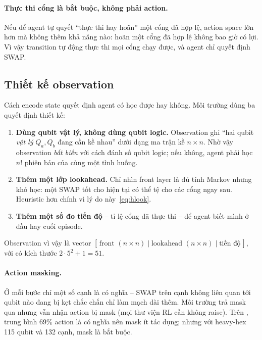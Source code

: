 \paragraph{Thực thi cổng là bắt buộc, không phải action.} Nếu để agent tự quyết ``thực thi hay hoãn''
một cổng đã hợp lệ, action space lớn hơn mà không thêm khả năng nào: hoãn một cổng đã hợp lệ không bao
giờ có lợi. Vì vậy transition tự động thực thi mọi cổng chạy được, và agent chỉ quyết định SWAP.

\subsection{Thiết kế observation}

Cách encode state quyết định agent có học được hay không. Môi trường  dùng ba quyết
định thiết kế:
\begin{enumerate}[label=(\alph*), noitemsep]
  \item \textbf{Dùng qubit vật lý, không dùng qubit logic.} Observation ghi ``hai qubit \emph{vật lý}
    $Q_a, Q_b$ đang cần kề nhau'' dưới dạng ma trận kề $n\times n$. Nhờ vậy observation \emph{bất biến}
    với cách đánh số qubit logic; nếu không, agent phải học $n!$ phiên bản của cùng một tình huống.
  \item \textbf{Thêm một lớp lookahead.} Chỉ nhìn front layer là đủ tính Markov nhưng khó học: một SWAP
    tốt cho hiện tại có thể tệ cho các cổng ngay sau. Heuristic  hơn 
    chính vì lý do này~\eqref{eq:hlook}.
  \item \textbf{Thêm một số đo tiến độ} -- tỉ lệ cổng đã thực thi -- để agent biết mình ở đầu hay cuối
    episode.
\end{enumerate}
Observation vì vậy là vector $[\,\text{front } (n\times n) \mid \text{lookahead } (n\times n) \mid
\text{tiến độ}\,]$, với  có kích thước $2\cdot5^2+1 = 51$.

\paragraph{Action masking.} Ở mỗi bước chỉ một số cạnh là có nghĩa -- SWAP trên cạnh không liên quan
tới qubit nào đang bị kẹt chắc chắn chỉ làm mạch dài thêm. Môi trường trả mask qua
 nhưng vẫn nhận action bị mask (mọi thư viện RL cần  không
raise). Trên , trung bình 69\% action là có nghĩa nên mask ít tác dụng; nhưng với
heavy-hex 115 qubit và 132 cạnh, mask là bắt buộc.

